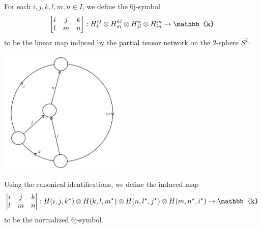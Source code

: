 \begin{definition}[$6$j-symbol]\label{def/6j-symbol}
  For each $i,j,k,l,m,n \in I$, we define the $6$j-symbol
  $$\sixJSymbol{i}{j}{k}{l}{m}{n}:
  H_{k}^{ij} \otimes H_{m}^{kl} \otimes H_{jl}^{n} \otimes H_{in}^{m} \to \mathbb{k}$$
  to be the linear map induced by the partial tensor network on
  the $2$-sphere $S^{2}$:
  \begin{center}
    \includegraphics[height=6cm]{6j-geometric}
  \end{center}

  \noindent Using the canonical identifications, we define the
  induced map
  $$\normalizedSixJSymbol{i}{j}{k}{l}{m}{n}: H(i,j,k^{\star}) \otimes H(k,l,m^{\star}) \otimes H(n,l^{\star},j^{\star}) \otimes H(m,n^{\star},i^{\star}) \to \mathbb{k}$$
  to be the normalized $6$j-symbol.
\end{definition}

